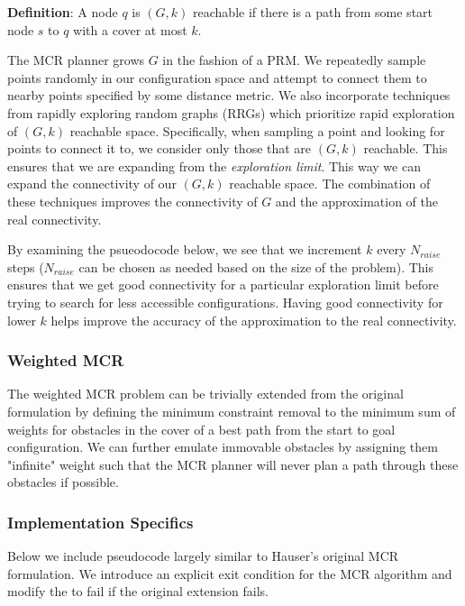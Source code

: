 {\bf{Definition}}: A node $q$ is $(G,k)$ reachable if there is a path from some start node $s$ to $q$ with a cover at most $k$. 

The MCR planner grows $G$ in the fashion of a PRM. We repeatedly sample points randomly in our configuration space and attempt to connect them to nearby points specified by some distance metric. We also incorporate techniques from rapidly exploring random graphs (RRGs) which prioritize rapid exploration of $(G,k)$ reachable space. Specifically, when sampling a point and looking for points to connect it to, we consider only those that are $(G,k)$ reachable. This ensures that we are expanding from the \emph{exploration limit}. This way we can expand the connectivity of our $(G,k)$ reachable space. The combination of these techniques improves the connectivity of $G$ and the approximation of the real connectivity. 

By examining the psueodocode below, we see that we increment $k$ every $N_{raise}$ steps ($N_{raise}$ can be chosen as needed based on the size of the problem). This ensures that we get good connectivity for a particular exploration limit before trying to search for less accessible configurations. Having good connectivity for lower $k$ helps improve the accuracy of the approximation to the real connectivity. 

\subsubsection{Weighted MCR}
The weighted MCR problem can be trivially extended from the original formulation by defining the minimum constraint removal to the minimum sum of weights for obstacles in the cover of a best path from the start to goal configuration. We can further emulate immovable obstacles by assigning them "infinite" weight such that the MCR planner will never plan a path through these obstacles if possible. 

\subsubsection{Implementation Specifics}
Below we include pseudocode largely similar to Hauser's original MCR formulation. We introduce an explicit exit condition for the MCR algorithm and modify the  to fail if the original extension fails. 

